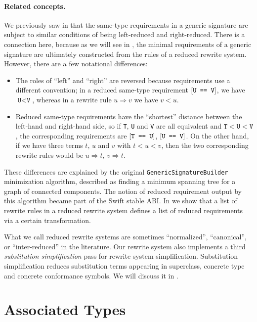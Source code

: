 \documentclass[../generics]{subfiles}
\begin{document}
\paragraph{Related concepts.}
We previously saw in  that the same-type requirements in a generic signature are subject to similar conditions of being left-reduced and right-reduced. There is a connection here, because as we will see in , the minimal requirements of a generic signature are ultimately constructed from the rules of a reduced rewrite system. However, there are a few notational differences:
\begin{itemize}
\item The roles of ``left'' and ``right'' are reversed because requirements use a different convention; in a reduced same-type requirement $[\texttt{U == V}]$, we have $\texttt{U} < \texttt{V}$, whereas in a rewrite rule $u\Rightarrow v$ we have $v<u$.
\item Reduced same-type requirements have the ``shortest'' distance between the left-hand and right-hand side, so if \texttt{T}, \texttt{U} and \texttt{V} are all equivalent and $\texttt{T}<\texttt{U}<\texttt{V}$, the corresponding requirements are $[\texttt{T == U}]$, $[\texttt{U == V}]$. On the other hand, if we have three terms $t$, $u$ and $v$ with $t<u<v$, then the two corresponding rewrite rules would be $u\Rightarrow t$, $v\Rightarrow t$.
\end{itemize}
These differences are explained by the original \texttt{GenericSignatureBuilder} minimization algorithm, described as finding a minimum spanning tree for a graph of connected components. The notion of reduced requirement output by this algorithm became part of the Swift stable ABI. In  we show that a list of rewrite rules in a reduced rewrite system defines a list of reduced requirements via a certain transformation.
 
What we call reduced rewrite systems are sometimes ``normalized'', ``canonical'', or ``inter-reduced'' in the literature. Our rewrite system also implements a third \emph{substitution simplification} pass for rewrite system simplification. Substitution simplification reduces substitution terms appearing in superclass, concrete type and concrete conformance symbols. We will discuss it in .

\section{Associated Types}\label{critical pairs}
\end{document}
